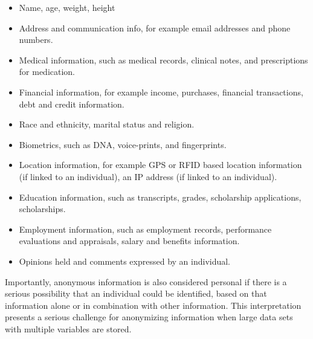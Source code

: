 \begin{itemize}
   \item Name, age, weight, height
   \item Address and communication info, for example email addresses and phone numbers.
   \item Medical information, such as medical records, clinical notes, and prescriptions for medication.
   \item Financial information, for example income, purchases, financial transactions, debt and credit information.
   \item Race and ethnicity, marital status and religion.
   \item Biometrics, such as DNA, voice-prints, and fingerprints.
   \item Location information, for example GPS or RFID based location information (if linked to an individual), an IP address (if linked to an individual).
   \item Education information, such as transcripts, grades, scholarship applications, scholarships.
   \item Employment information, such as employment records, performance evaluations and appraisals, salary and benefits information.
   \item Opinions held and comments expressed by an individual.
\end{itemize} 

Importantly, anonymous information is also considered personal if there is a serious possibility that an individual could be identified, based on that information alone or in combination with other information. This interpretation presents a serious challenge for anonymizing information when large data sets with multiple variables are stored.


